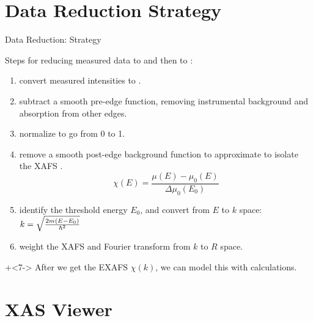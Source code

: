 \section{Data Reduction Strategy}


\begin{slide}{Data Reduction: Strategy}

  Steps for reducing measured data to {\mue} and then to {\chik}:

\begin{cenpage}{125mm}
  \begin{enumerate}[<+->]
  \item convert measured intensities to {\mue}.
  \item subtract a smooth pre-edge function, removing instrumental
    background and absorption from other edges.
  \item normalize {\mue} to go from 0 to 1.\\
    {}

  \item remove a smooth post-edge background function to approximate
    {\bkg} to isolate the XAFS {\chie}.
    \[ \chi(E) = \frac{\mu(E) -\mu_0(E)}{\Delta \mu_0(E_0)} \]

  \item identify the threshold energy ${E_0}$, and convert from
    $E$ to $k$ space: $k= \sqrt{{{2m(E-E_0)}\over{\hbar^2}}}$
  \item weight the XAFS {\chik} and Fourier transform from
    ${k}$ to ${R}$ space.
  \end{enumerate}

\end{cenpage}

\vmm\vmm
\onslide+<7->
  After we get the EXAFS $\chi(k)$, we can model this with {\feff}
  calculations.

\end{slide}

\section{XAS Viewer}

